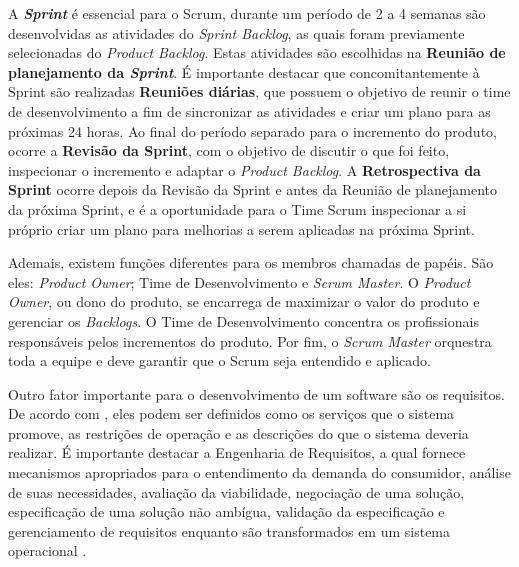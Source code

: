 A \textbf{\textit{Sprint}} é essencial para o Scrum, durante um período de 2 a 4 semanas são desenvolvidas as atividades do \textit{Sprint Backlog}, as quais foram previamente selecionadas do \textit{Product Backlog}. Estas atividades são escolhidas na \textbf{Reunião de planejamento da \textit{Sprint}}. É importante destacar que concomitantemente à Sprint são realizadas \textbf{Reuniões diárias}, que possuem o objetivo de reunir o time de desenvolvimento a fim de sincronizar as atividades e criar um plano para as próximas 24 horas. Ao final do período separado para o incremento do produto, ocorre a \textbf{Revisão da Sprint}, com o objetivo de discutir o que foi feito, inspecionar o incremento e adaptar o \textit{Product Backlog}. A \textbf{Retrospectiva da Sprint} ocorre depois da Revisão da Sprint e antes da Reunião de planejamento da próxima Sprint, e é a oportunidade para o Time Scrum inspecionar a si próprio criar um plano para melhorias a serem aplicadas na próxima Sprint.

Ademais, existem funções diferentes para os membros chamadas de papéis. São eles: \textit{Product Owner}; Time de Desenvolvimento e \textit{Scrum Master}. 
O \textit{Product Owner}, ou dono do produto, se encarrega de maximizar o valor do produto e gerenciar os \textit{Backlogs}. O Time de Desenvolvimento concentra os profissionais responsáveis pelos incrementos do produto. Por fim, o \textit{Scrum Master} orquestra toda a equipe e deve garantir que o Scrum seja entendido e aplicado.

Outro fator importante para o desenvolvimento de um software são os requisitos. De acordo com \cite{Sommervile2010}, eles podem ser definidos como os serviços que o sistema promove, as restrições de operação e as descrições do que o sistema deveria realizar. É importante destacar a Engenharia de Requisitos, a qual fornece mecanismos apropriados para o entendimento da demanda do consumidor, análise de suas necessidades, avaliação da viabilidade, negociação de uma solução, especificação de uma solução não ambígua, validação da especificação e gerenciamento de requisitos enquanto são transformados em um sistema operacional \citep{Pressman2014}. 

